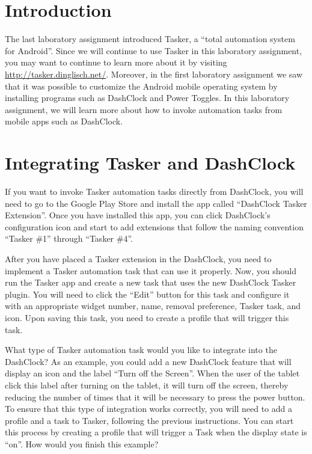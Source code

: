 

\usepackage[compact]{titlesec}



\section*{Introduction}

The last laboratory assignment introduced Tasker, a ``total automation system for Android''.  Since we will continue to
use Tasker in this laboratory assignment, you may want to continue to learn more about it by visiting
\url{http://tasker.dinglisch.net/}. Moreover, in the first laboratory assignment we saw that it was possible to
customize the Android mobile operating system by installing programs such as DashClock and Power Toggles.  In this
laboratory assignment, we will learn more about how to invoke automation tasks from mobile apps such as DashClock.

\section*{Integrating Tasker and DashClock}

If you want to invoke Tasker automation tasks directly from DashClock, you will need to go to the Google Play Store and
install the app called ``DashClock Tasker Extension''.  Once you have installed this app, you can click DashClock's
configuration icon and start to add extensions that follow the naming convention ``Tasker \#1'' through ``Tasker \#4''.


After you have placed a Tasker extension in the DashClock, you need to implement a Tasker automation task that can use
it properly.  Now, you should run the Tasker app and create a new task that uses the new DashClock Tasker plugin.  You
will need to click the ``Edit'' button for this task and configure it with an appropriate widget number, name, removal
preference, Tasker task, and icon. Upon saving this task, you need to create a profile that will trigger this task.

What type of Tasker automation task would you like to integrate into the DashClock?  As an example, you could add a new
DashClock feature that will display an icon and the label ``Turn off the Screen''.  When the user of the tablet click
this label after turning on the tablet, it will turn off the screen, thereby reducing the number of times that it will
be necessary to press the power button.  To ensure that this type of integration works correctly, you will need to add a
profile and a task to Tasker, following the previous instructions.  You can start this process by creating a profile
that will trigger a Task when the display state is ``on''.  How would you finish this example?

